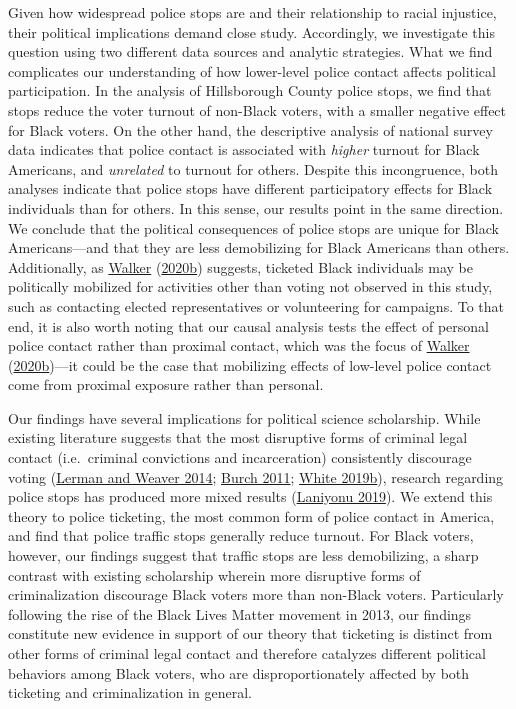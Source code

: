 \documentclass[
  12pt,
]{article}
\begin{document}
Given how widespread police stops are and their relationship to racial injustice, their political implications demand close study. Accordingly, we investigate this question using two different data sources and analytic strategies. What we find complicates our understanding of how lower-level police contact affects political participation. In the analysis of Hillsborough County police stops, we find that stops reduce the voter turnout of non-Black voters, with a smaller negative effect for Black voters. On the other hand, the descriptive analysis of national survey data indicates that police contact is associated with \emph{higher} turnout for Black Americans, and \emph{unrelated} to turnout for others. Despite this incongruence, both analyses indicate that police stops have different participatory effects for Black individuals than for others. In this sense, our results point in the same direction. We conclude that the political consequences of police stops are unique for Black Americans---and that they are less demobilizing for Black Americans than others. Additionally, as \protect\hyperlink{ref-Walker2020a}{Walker} (\protect\hyperlink{ref-Walker2020a}{2020b}) suggests, ticketed Black individuals may be politically mobilized for activities other than voting not observed in this study, such as contacting elected representatives or volunteering for campaigns. To that end, it is also worth noting that our causal analysis tests the effect of personal police contact rather than proximal contact, which was the focus of \protect\hyperlink{ref-Walker2020a}{Walker} (\protect\hyperlink{ref-Walker2020a}{2020b})---it could be the case that mobilizing effects of low-level police contact come from proximal exposure rather than personal.

Our findings have several implications for political science scholarship. While existing literature suggests that the most disruptive forms of criminal legal contact (i.e.~criminal convictions and incarceration) consistently discourage voting (\protect\hyperlink{ref-Lerman2014}{Lerman and Weaver 2014}; \protect\hyperlink{ref-Burch2011}{Burch 2011}; \protect\hyperlink{ref-White2019a}{White 2019b}), research regarding police stops has produced more mixed results (\protect\hyperlink{ref-Laniyonu2019}{Laniyonu 2019}). We extend this theory to police ticketing, the most common form of police contact in America, and find that police traffic stops generally reduce turnout. For Black voters, however, our findings suggest that traffic stops are less demobilizing, a sharp contrast with existing scholarship wherein more disruptive forms of criminalization discourage Black voters more than non-Black voters. Particularly following the rise of the Black Lives Matter movement in 2013, our findings constitute new evidence in support of our theory that ticketing is distinct from other forms of criminal legal contact and therefore catalyzes different political behaviors among Black voters, who are disproportionately affected by both ticketing and criminalization in general.
\end{document}

